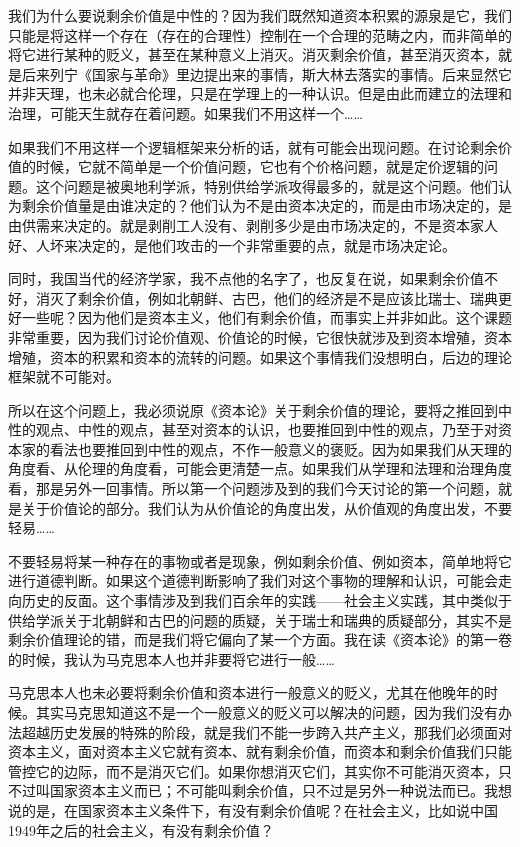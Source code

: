 \documentclass[UTF8, 12pt, a4paper]{ctexrep}
\begin{document}
我们为什么要说剩余价值是中性的？因为我们既然知道资本积累的源泉是它，我们只能是将这样一个存在（存在的合理性）控制在一个合理的范畴之内，而非简单的将它进行某种的贬义，甚至在某种意义上消灭。消灭剩余价值，甚至消灭资本，就是后来列宁《国家与革命》里边提出来的事情，斯大林去落实的事情。后来显然它并非天理，也未必就合伦理，只是在学理上的一种认识。但是由此而建立的法理和治理，可能天生就存在着问题。如果我们不用这样一个……

如果我们不用这样一个逻辑框架来分析的话，就有可能会出现问题。在讨论剩余价值的时候，它就不简单是一个价值问题，它也有个价格问题，就是定价逻辑的问题。这个问题是被奥地利学派，特别供给学派攻得最多的，就是这个问题。他们认为剩余价值量是由谁决定的？他们认为不是由资本决定的，而是由市场决定的，是由供需来决定的。就是剥削工人没有、剥削多少是由市场决定的，不是资本家人好、人坏来决定的，是他们攻击的一个非常重要的点，就是市场决定论。

同时，我国当代的经济学家，我不点他的名字了，也反复在说，如果剩余价值不好，消灭了剩余价值，例如北朝鲜、古巴，他们的经济是不是应该比瑞士、瑞典更好一些呢？因为他们是资本主义，他们有剩余价值，而事实上并非如此。这个课题非常重要，因为我们讨论价值观、价值论的时候，它很快就涉及到资本增殖，资本增殖，资本的积累和资本的流转的问题。如果这个事情我们没想明白，后边的理论框架就不可能对。

所以在这个问题上，我必须说原《资本论》关于剩余价值的理论，要将之推回到中性的观点、中性的观点，甚至对资本的认识，也要推回到中性的观点，乃至于对资本家的看法也要推回到中性的观点，不作一般意义的褒贬。因为如果我们从天理的角度看、从伦理的角度看，可能会更清楚一点。如果我们从学理和法理和治理角度看，那是另外一回事情。所以第一个问题涉及到的我们今天讨论的第一个问题，就是关于价值论的部分。我们认为从价值论的角度出发，从价值观的角度出发，不要轻易……

不要轻易将某一种存在的事物或者是现象，例如剩余价值、例如资本，简单地将它进行道德判断。如果这个道德判断影响了我们对这个事物的理解和认识，可能会走向历史的反面。这个事情涉及到我们百余年的实践——社会主义实践，其中类似于供给学派关于北朝鲜和古巴的问题的质疑，关于瑞士和瑞典的质疑部分，其实不是剩余价值理论的错，而是我们将它偏向了某一个方面。我在读《资本论》的第一卷的时候，我认为马克思本人也并非要将它进行一般……

马克思本人也未必要将剩余价值和资本进行一般意义的贬义，尤其在他晚年的时候。其实马克思知道这不是一个一般意义的贬义可以解决的问题，因为我们没有办法超越历史发展的特殊的阶段，就是我们不能一步跨入共产主义，那我们必须面对资本主义，面对资本主义它就有资本、就有剩余价值，而资本和剩余价值我们只能管控它的边际，而不是消灭它们。如果你想消灭它们，其实你不可能消灭资本，只不过叫国家资本主义而已；不可能叫剩余价值，只不过是另外一种说法而已。我想说的是，在国家资本主义条件下，有没有剩余价值呢？在社会主义，比如说中国1949年之后的社会主义，有没有剩余价值？
\end{document}
